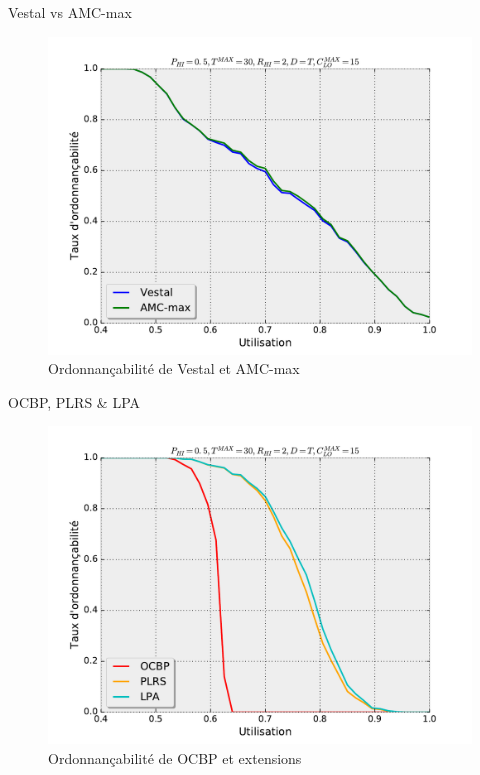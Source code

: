 \documentclass{bredelebeamer}
\begin{document}
\begin{frame}{Vestal vs AMC-max}
\begin{figure}[h]
\centering
\includegraphics[width=\textwidth,height=0.8\textheight,keepaspectratio]{./results/perfAMCVestal.pdf}
\caption{Ordonnançabilité de Vestal et AMC-max}
\label{res:vestalamc}
\end{figure}
\end{frame}


\begin{frame}{OCBP, PLRS \& LPA}
\begin{figure}[h]
\includegraphics[width=\textwidth,height=0.8\textheight,keepaspectratio]{./results/perfOCBPetc.pdf}
\caption{Ordonnançabilité de OCBP et extensions}
\label{res:ocbpbext}
\end{figure}
\end{frame}
\end{document}
